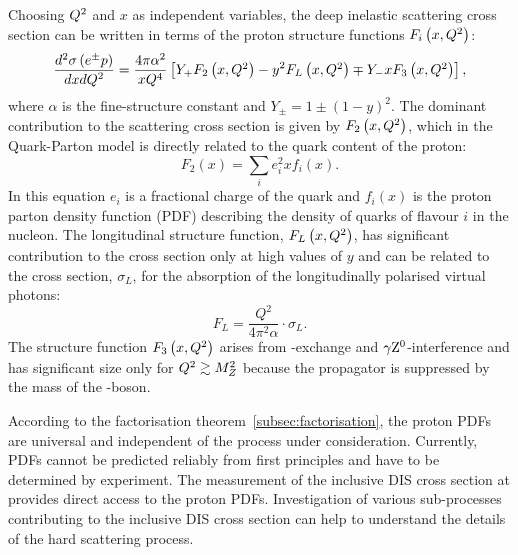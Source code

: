Choosing $\mbox{${Q^2}$}$ and $x$ as independent variables, the deep inelastic scattering cross section can be written in terms of the proton structure functions $F_i\left(x,\mbox{${Q^2}$}\right)$:
\begin{equation}
\frac{d^2\sigma\left( e^\pm p \right) }{dxd\mbox{${Q^2}$}} = \frac{4\pi\alpha^2}{xQ^4}\left[ Y_+F_2\left(x,\mbox{${Q^2}$}\right) - y^2F_L\left(x,\mbox{${Q^2}$}\right) \mp Y_-xF_3\left(x,\mbox{${Q^2}$}\right) \right],
\label{eq:ddifDIS}
\end{equation}
where $\alpha$ is the fine-structure constant and $Y_\pm = 1 \pm \left( 1 - y \right)^2$. The dominant contribution to the scattering cross section is given by $F_2\left(x,\mbox{${Q^2}$}\right)$, which in the Quark-Parton model is directly related to the quark content of the proton:
\begin{equation}
F_2\left(x\right) = \sum_i{e_i^2xf_i\left(x\right)}.
\label{eq:f2pdf}
\end{equation}
In this equation $e_i$ is a fractional charge of the quark and $f_i\left(x\right)$ is the proton parton density function (PDF) describing the density of quarks of flavour $i$ in the nucleon. The longitudinal structure function, $F_L\left(x,\mbox{${Q^2}$}\right)$, has significant contribution to the cross section only at high values of $y$ and can be related to the cross section, $\sigma_L$, for the absorption of the longitudinally polarised virtual photons:
\begin{equation}
F_L = \frac{Q^2}{4\pi^2\alpha}\cdot \sigma_L.
\label{eq:sigmal}
\end{equation}
The structure function $F_3\left(x,\mbox{${Q^2}$}\right)$ arises from \zn-exchange and $\gamma\mbox{$\rm{Z}^0$}$-interference and has significant size only for $\mbox{${Q^2}$} \gtrsim M^2_Z$ because the \zn propagator is suppressed by the mass of the \zn-boson.

According to the factorisation theorem~\ref{subsec:factorisation}, the proton PDFs are universal and independent of the process under consideration. Currently, PDFs cannot be predicted reliably from first principles and have to be determined by experiment. The measurement of the inclusive DIS cross section at \hera provides direct access to the proton PDFs. Investigation of various sub-processes contributing to the inclusive DIS cross section can help to understand the details of the hard scattering process.
